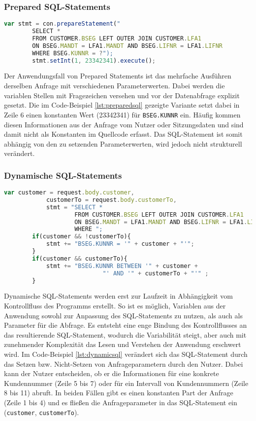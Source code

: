 \subsubsection{Prepared SQL-Statements}

	\begin{lstlisting}[caption={Prepared Statements eingebettet im Quellcode}, label={lst:preparedsql}, language=JavaScript]
		var stmt = con.prepareStatement("
		SELECT *
		FROM CUSTOMER.BSEG LEFT OUTER JOIN CUSTOMER.LFA1
		ON BSEG.MANDT = LFA1.MANDT AND BSEG.LIFNR = LFA1.LIFNR
		WHERE BSEG.KUNNR = ?");
		stmt.setInt(1, 23342341).execute();
	\end{lstlisting}

Der Anwendungsfall von Prepared Statements ist das mehrfache Ausführen derselben Anfrage mit verschiedenen Parameterwerten.
Dabei werden die variablen Stellen mit Fragezeichen versehen und vor der Datenabfrage explizit gesetzt.
Die im Code-Beispiel \ref{lst:preparedsql} gezeigte Variante setzt dabei in Zeile 6 einen konstanten Wert (23342341) für \texttt{BSEG.KUNNR} ein.
Häufig kommen diesen Informationen aus der Anfrage vom Nutzer oder Sitzungsdaten und sind damit nicht als Konstanten im Quellcode erfasst.
Das SQL-Statement ist somit abhängig von den zu setzenden Parameterwerten, wird jedoch nicht strukturell verändert.

\subsubsection{Dynamische SQL-Statements}

	\begin{lstlisting}[caption={Der Kontrollfluss verändert dynamische SQL-Statements}, label={lst:dynamicsql}, language=JavaScript]
		var customer = request.body.customer,
		    customerTo = request.body.customerTo,
		    stmt = "SELECT *
					FROM CUSTOMER.BSEG LEFT OUTER JOIN CUSTOMER.LFA1
					ON BSEG.MANDT = LFA1.MANDT AND BSEG.LIFNR = LFA1.LIFNR
					WHERE ";
		if(customer && !customerTo){
			stmt += "BSEG.KUNNR = '" + customer + "'";
		}
		if(customer && customerTo){
			stmt += "BSEG.KUNNR BETWEEN '" + customer +
							"' AND '" + customerTo + "'" ;
		}
	\end{lstlisting}

Dynamische SQL-Statements werden erst zur Laufzeit in Abhängigkeit vom Kontrollfluss des Programms erstellt.
So ist es möglich, Variablen aus der Anwendung sowohl zur Anpassung des SQL-Statements zu nutzen, als auch als Parameter für die Abfrage.
Es entsteht eine enge Bindung des Kontrollflusses an das resultierende SQL-Statement, wodurch die Variabilität steigt, aber auch mit zunehmender Komplexität das Lesen und Verstehen der Anwendung erschwert wird.
Im Code-Beispiel \ref{lst:dynamicsql} verändert sich das SQL-Statement durch das Setzen bzw. Nicht-Setzen von Anfrageparametern durch den Nutzer.
Dabei kann der Nutzer entscheiden, ob er die Informationen für eine konkrete Kundennummer (Zeile 5 bis 7) oder für ein Intervall von Kundennummern (Zeile 8 bis 11) abruft.
In beiden Fällen gibt es einen konstanten Part der Anfrage (Zeile 1 bis 4) und es fließen die Anfrageparameter in das SQL-Statement ein (\texttt{customer}, \texttt{customerTo}).

